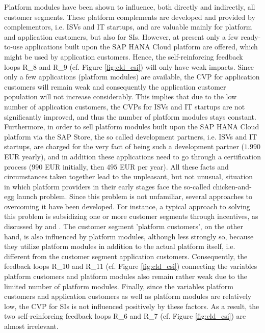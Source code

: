 Platform modules have been shown to influence, both directly and indirectly, all customer segments. These platform complements are developed and provided by complementors, i.e. \acp{ISV} and \ac{IT} startups, and are valuable mainly for platform and application customers, but also for \acp{SI}. However, at present only a few ready-to-use applications built upon the SAP HANA Cloud platform are offered, which might be used by application customers. Hence, the self-reinforcing feedback loops R\_8 and R\_9 (cf. Figure \ref{fig:cld_csi}) will only have weak impacts. Since only a few applications (platform modules) are available, the \ac{CVP} for application customers will remain weak and consequently the application customer population will not increase considerably. This implies that due to the low number of application customers, the \acp{CVP} for \acp{ISV} and \ac{IT} startups are not significantly improved, and thus the number of platform modules stays constant. Furthermore, in order to sell platform modules built upon the SAP HANA Cloud platform via the SAP Store, the so called development partners, i.e. \acp{ISV} and \ac{IT} startups, are charged for the very fact of being such a development partner ($1.990$ \ac{EUR} yearly), and in addition these applications need to go through a certification process ($990$ \ac{EUR} initially, then $495$ \ac{EUR} per year). All these facts and circumstances taken together lead to the unpleasant, but not unusual, situation in which platform providers in their early stages face the so-called chicken-and-egg launch problem. Since this problem is not unfamiliar, several approaches to overcoming it have been developed. For instance, a typical approach to solving this problem is subsidizing one or more customer segments through incentives, as discussed by \citet[pp. 1,5]{Eisenmann2006} and \citet[pp. 195-196]{Evans2003}. The customer segment 'platform customers', on the other hand, is also influenced by platform modules, although less strongly so, because they utilize platform modules in addition to the actual platform itself, i.e. different from the customer segment application customers. Consequently, the feedback loops R\_10 and R\_11 (cf. Figure \ref{fig:cld_csi}) connecting the variables platform customers and platform modules also remain rather weak due to the limited number of platform modules. Finally, since the variables platform customers and application customers as well as platform modules are relatively low, the \ac{CVP} for \acp{SI} is not influenced positively by these factors. As a result, the two self-reinforcing feedback loops R\_6 and R\_7 (cf. Figure \ref{fig:cld_csi}) are almost irrelevant.

